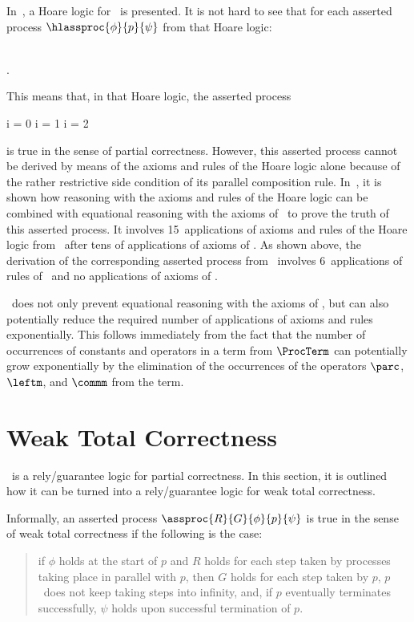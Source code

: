 \documentclass[runningheads]{llncs}
\begin{document}
In~\cite{BM19b}, a Hoare logic for \deACPei\ is presented.
It is not hard to see that for each asserted process 
$\hlassproc{\phi}{p}{\psi}$ from that Hoare logic:
\begin{ldispl}
\; \\
\quad{}\quad
{} 
\;. 
\end{ldispl}%
This means that, in that Hoare logic, the asserted process
\begin{ldispl}
  {i = 0 \Lor i = 1 \Lor i = 2} 
\end{ldispl}%
is true in the sense of partial correctness.
However, this asserted process cannot be derived by means of the axioms 
and rules of the Hoare logic alone because of the rather restrictive 
side condition of its parallel composition rule.
In~\cite{BM19b}, it is shown how reasoning with the axioms and rules of 
the Hoare logic can be combined with equational reasoning with the 
axioms of \deACPei\ to prove the truth of this asserted process. 
It involves 15~applications of axioms and rules of the Hoare logic 
from~\cite{BM19b} after tens of applications of axioms of 
\mbox{\deACPei}.  
As shown above, the derivation of the corresponding asserted process 
from \RG\ involves 6~applications of rules of \RG\ and no applications
of axioms of \deACPei. 

\RG\ does not only prevent equational reasoning with the axioms of 
\deACPei, but can also potentially reduce the required number of 
applications of axioms and rules exponentially.
This follows immediately from the fact that the number of occurrences of 
constants and operators in a term from $\ProcTerm$ can potentially grow 
exponentially by the elimination of the occurrences of the operators 
$\parc$, $\leftm$, and $\commm$ from the term.

\section{Weak Total Correctness}
\label{sect-convergence}

\RG\ is a rely/guarantee logic for partial correctness.
In this section, it is outlined how it can be turned into a 
rely/guarantee logic for weak total correctness.

Informally, an asserted process $\assproc{R}{G}{\phi}{p}{\psi}$ is true 
in the sense of weak total correctness if the following is the case:
\begin{quote}
if $\phi$ holds at the start of $p$ and $R$ holds for each step taken by
processes taking place in parallel with $p$, then 
$G$ holds for each step taken by $p$, $p$~does not keep taking steps into 
infinity, and, if $p$ eventually terminates successfully, $\psi$ holds 
upon successful termination of $p$. 
\end{quote}
\end{document}
